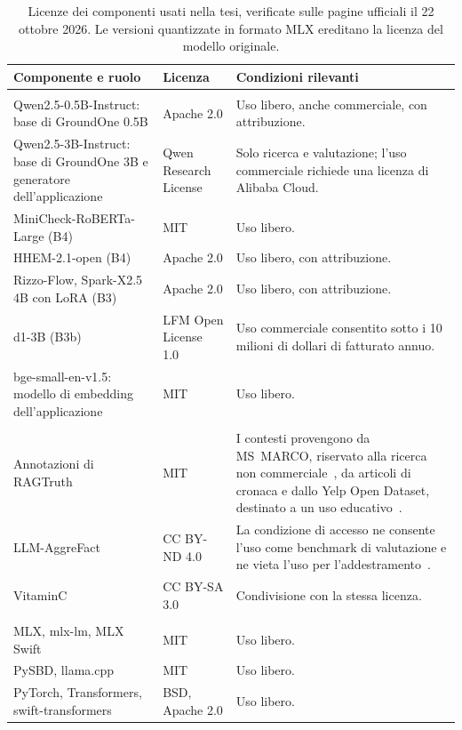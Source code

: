 \begin{table}[htbp]
\centering
\caption{Licenze dei componenti usati nella tesi, verificate sulle pagine ufficiali il 22 ottobre 2026. Le versioni
quantizzate in formato MLX ereditano la licenza del modello originale.}
\label{tab:setup-licences}
\small
\begin{tabularx}{\textwidth}{@{}>{\raggedright\arraybackslash}p{}>{\raggedright\arraybackslash}p{}>{\raggedright\arraybackslash}X@{}}
\toprule
Componente e ruolo & Licenza & Condizioni rilevanti \\
\midrule
\multicolumn{3}{@{}l}{\textit{Modelli}} \\
Qwen2.5-0.5B-Instruct: base di GroundOne 0.5B & Apache 2.0 & Uso libero, anche commerciale, con attribuzione. \\ \addlinespace[2pt]
Qwen2.5-3B-Instruct: base di GroundOne 3B e generatore dell'applicazione & Qwen Research License~\cite{qwen2024researchlicense} & Solo ricerca e valutazione; l'uso commerciale richiede una licenza di Alibaba Cloud. \\ \addlinespace[2pt]
MiniCheck-RoBERTa-Large (B4) & MIT & Uso libero. \\ \addlinespace[2pt]
HHEM-2.1-open (B4) & Apache 2.0 & Uso libero, con attribuzione. \\ \addlinespace[2pt]
Rizzo-Flow, Spark-X2.5 4B con LoRA (B3) & Apache 2.0 & Uso libero, con attribuzione. \\ \addlinespace[2pt]
d1-3B (B3b) & LFM Open License 1.0~\cite{liquid2025lfmlicense} & Uso commerciale consentito sotto i 10 milioni di dollari di fatturato annuo. \\ \addlinespace[2pt]
bge-small-en-v1.5: modello di embedding dell'applicazione & MIT & Uso libero. \\
\addlinespace
\multicolumn{3}{@{}l}{\textit{Dati}} \\
Annotazioni di RAGTruth & MIT & I contesti provengono da MS~MARCO, riservato alla ricerca non commerciale~\cite{msmarco2026terms}, da articoli di cronaca e dallo Yelp Open Dataset, destinato a un uso educativo~\cite{yelpdataset}. \\ \addlinespace[2pt]
LLM-AggreFact & CC BY-ND 4.0 & La condizione di accesso ne consente l'uso come benchmark di valutazione e ne vieta l'uso per l'addestramento~\cite{hf_llmaggrefact}. \\ \addlinespace[2pt]
VitaminC & CC BY-SA 3.0 & Condivisione con la stessa licenza. \\
\addlinespace
\multicolumn{3}{@{}l}{\textit{Software}} \\
MLX, mlx-lm, MLX Swift & MIT & Uso libero. \\ \addlinespace[2pt]
PySBD, llama.cpp & MIT & Uso libero. \\ \addlinespace[2pt]
PyTorch, Transformers, swift-transformers & BSD, Apache 2.0 & Uso libero. \\
\bottomrule
\end{tabularx}
\end{table}

